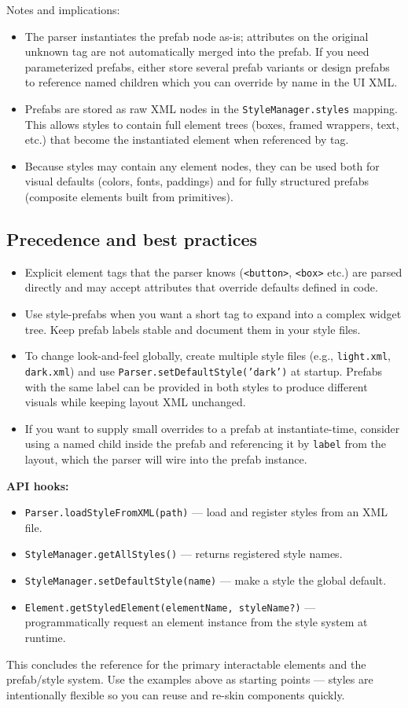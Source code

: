 \documentclass[a4paper,11pt]{article}
\begin{document}
Notes and implications:
\begin{itemize}
    \item The parser instantiates the prefab node as-is; attributes on the original unknown tag are not automatically merged into the prefab. If you need parameterized prefabs, either store several prefab variants or design prefabs to reference named children which you can override by name in the UI XML.
    \item Prefabs are stored as raw XML nodes in the \texttt{StyleManager.styles} mapping. This allows styles to contain full element trees (boxes, framed wrappers, text, etc.) that become the instantiated element when referenced by tag.
    \item Because styles may contain any element nodes, they can be used both for visual defaults (colors, fonts, paddings) and for fully structured prefabs (composite elements built from primitives).
\end{itemize}

\subsection*{Precedence and best practices}
\begin{itemize}
    \item Explicit element tags that the parser knows (\texttt{<button>}, \texttt{<box>} etc.) are parsed directly and may accept attributes that override defaults defined in code.
    \item Use style-prefabs when you want a short tag to expand into a complex widget tree. Keep prefab labels stable and document them in your style files.
    \item To change look-and-feel globally, create multiple style files (e.g., \texttt{light.xml}, \texttt{dark.xml}) and use \texttt{Parser.setDefaultStyle('dark')} at startup. Prefabs with the same label can be provided in both styles to produce different visuals while keeping layout XML unchanged.
    \item If you want to supply small overrides to a prefab at instantiate-time, consider using a named child inside the prefab and referencing it by \texttt{label} from the layout, which the parser will wire into the prefab instance.
\end{itemize}

\bigskip
\noindent\textbf{API hooks:}
\begin{itemize}
    \item \texttt{Parser.loadStyleFromXML(path)} — load and register styles from an XML file.
    \item \texttt{StyleManager.getAllStyles()} — returns registered style names.
    \item \texttt{StyleManager.setDefaultStyle(name)} — make a style the global default.
    \item \texttt{Element.getStyledElement(elementName, styleName?)} — programmatically request an element instance from the style system at runtime.
\end{itemize}

\bigskip
\noindent This concludes the reference for the primary interactable elements and the prefab/style system. Use the examples above as starting points — styles are intentionally flexible so you can reuse and re-skin components quickly.
\end{document}
